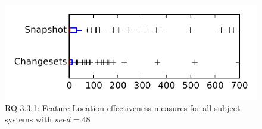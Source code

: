 
\begin{figure}
\centering
\includegraphics[height=0.4\textheight]{figures/flt_seed/rq1_tiny_48}
\caption{RQ 3.3.1: Feature Location effectiveness measures for all subject systems with $seed=48$}
\label{fig:flt_seed:rq1:tiny}
\end{figure}
